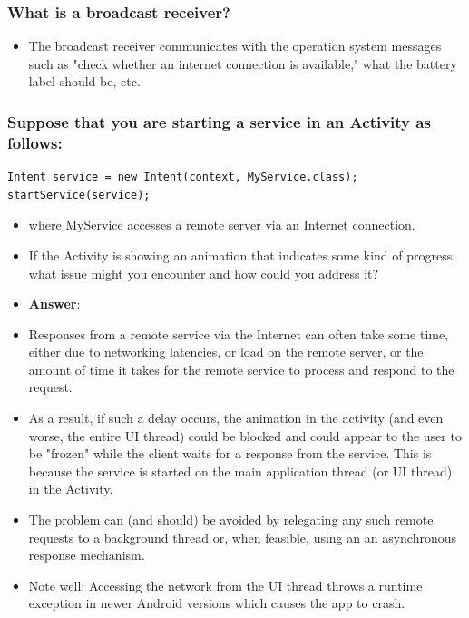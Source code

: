 \documentclass[9pt, b5paper]{article}
\begin{document}
\subsubsection{What is a broadcast receiver?}
\label{sec-1-4-3}
\begin{itemize}
\item The broadcast receiver communicates with the operation system messages such as "check whether an internet connection is available," what the battery label should be, etc.
\end{itemize}

\subsubsection{Suppose that you are starting a service in an Activity as follows:}
\label{sec-1-4-4}
\begin{verbatim}
Intent service = new Intent(context, MyService.class);             
startService(service);
\end{verbatim}
\begin{itemize}
\item where MyService accesses a remote server via an Internet connection.
\item If the Activity is showing an animation that indicates some kind of progress, what issue might you encounter and how could you address it?
\item \textbf{Answer}:
\item Responses from a remote service via the Internet can often take some time, either due to networking latencies, or load on the remote server, or the amount of time it takes for the remote service to process and respond to the request.
\item As a result, if such a delay occurs, the animation in the activity (and even worse, the entire UI thread) could be blocked and could appear to the user to be "frozen" while the client waits for a response from the service. This is because the service is started on the main application thread (or UI thread) in the Activity.
\item The problem can (and should) be avoided by relegating any such remote requests to a background thread or, when feasible, using an an asynchronous response mechanism.
\item Note well: Accessing the network from the UI thread throws a runtime exception in newer Android versions which causes the app to crash.
\end{itemize}
\end{document}
